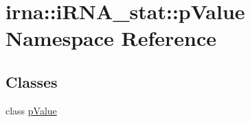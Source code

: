 \hypertarget{namespaceirna_1_1iRNA__stat_1_1pValue}{
\section{irna\-:\-:i\-R\-N\-A\-\_\-stat\-:\-:p\-Value \-Namespace \-Reference}
\label{namespaceirna_1_1iRNA__stat_1_1pValue}
}
\subsection*{\-Classes}
\begin{DoxyCompactItemize}
\item 
class \hyperlink{classirna_1_1iRNA__stat_1_1pValue_1_1pValue}{p\-Value}
\end{DoxyCompactItemize}
